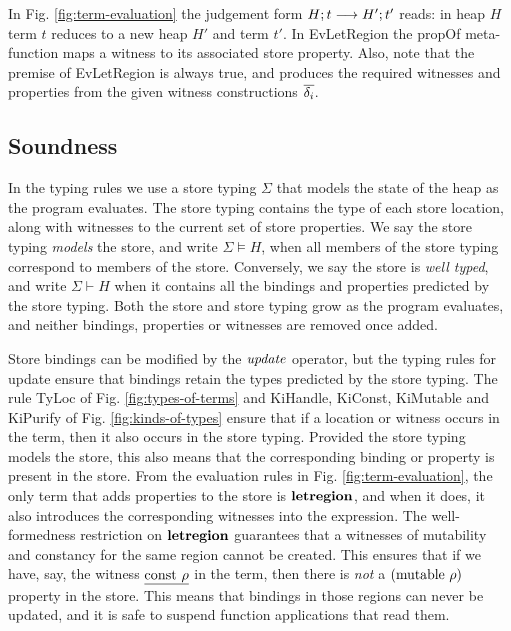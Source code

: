 In Fig. \ref{fig:term-evaluation} the judgement form $H ; t \longrightarrow H' ; t'$ reads: in heap $H$ term $t$ reduces to a new heap $H'$ and term $t'$. In EvLetRegion the propOf meta-function maps a witness to its associated store property. Also, note that the premise of EvLetRegion is always true, and produces the required witnesses and properties from the given witness constructions $\overline{\delta_i}$.
\vspace{-1em}


\vspace{-3em}
\subsection{Soundness}
\label{Language:Soundness}
In the typing rules we use a store typing $\Sigma$ that models the state of the heap as the program evaluates. The store typing contains the type of each store location, along with witnesses to the current set of store properties. We say the store typing \emph{models} the store, and write $\Sigma \models H$, when all members of the store typing correspond to members of the store. Conversely, we say the store is \emph{well typed}, and write $\Sigma \vdash H$ when it contains all the bindings and properties predicted by the store typing. Both the store and store typing grow as the program evaluates, and neither bindings, properties or witnesses are removed once added. 




Store bindings can be modified by the $\operatorname{\mathit{update}}$ operator, but the typing rules for update ensure that bindings retain the types predicted by the store typing. The rule TyLoc of Fig. \ref{fig:types-of-terms} and KiHandle, KiConst, KiMutable and KiPurify of Fig. \ref{fig:kinds-of-types} ensure that if a location or witness occurs in the term, then it also occurs in the store typing. Provided the store typing models the store, this also means that the corresponding binding or property is present in the store. From the evaluation rules in Fig. \ref{fig:term-evaluation}, the only term that adds properties to the store is $\textrm{\textbf{letregion}}$, and when it does,  it also introduces the corresponding witnesses into the expression. The well-formedness restriction on $\textrm{\textbf{letregion}}$ guarantees that a witnesses of mutability and constancy for the same region cannot be created. This ensures that if we have, say, the witness $\underline{\textrm{const} \ \rho}$ in the term, then there is \emph{not} a $(\textrm{mutable} \ \rho)$ property in the store. This means that bindings in those regions can never be updated, and it is safe to suspend function applications that read them.

